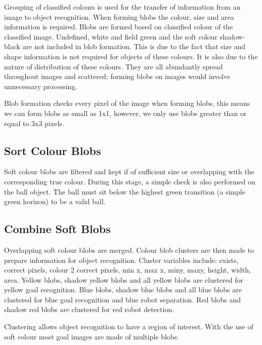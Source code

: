 Grouping of classified colours is used for the transfer of information from an image to object recognition. When forming blobs the colour, size and area information is required. Blobs are formed based on classified colour of the classified image. Undefined, white and field green and the soft colour shadow-black are not included in blob formation. This is due to the fact that size and shape information is not required for objects of these colours. It is also due to the nature of distribution of these colours. They are all abundantly spread throughout images and scattered; forming blobs on images would involve unnecessary processing. 

Blob formation checks every pixel of the image when forming blobs, this means we can form blobs as small as 1x1, however, we only use blobs greater than or equal to 3x3 pixels. 

\subsection{Sort Colour Blobs}

Soft colour blobs are filtered and kept if of sufficient size or overlapping with the corresponding true colour. During this stage, a simple check is also performed on the ball object. The ball must sit below the highest green transition (a simple green horizon) to be a valid ball.

\subsection{Combine Soft Blobs}

Overlapping soft colour blobs are merged. Colour blob clusters are then made to prepare information for object recognition. Cluster variables include: exists, correct pixels, colour 2 correct pixels, min x, max x, miny, maxy, height, width, area. 
Yellow blobs, shadow yellow blobs and all yellow blobs are clustered for yellow goal recognition. Blue blobs, shadow blue blobs and all blue blobs are clustered for blue goal recognition and blue robot separation. Red blobs and shadow red blobs are clustered for red robot detection.

Clustering allows object recognition to have a region of interest. With the use of soft colour most goal images are made of multiple blobs.